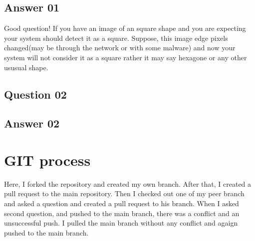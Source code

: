 \documentclass[11pt, letterpaper]{article}
\begin{document}
\subsection{Answer 01}
Good question! If you have an image of an square shape and  you are expecting your system should detect it as a square. Suppose, this image edge pixels changed(may be through the network or with some malware) and now  your system will not consider it as a square rather it may say hexagone or any other ususual shape.
\subsection{Question 02}
\subsection{Answer 02}
\section{GIT process}
Here, I forked the repository and created my own branch. After that, I created a pull request to the main repository. Then I checked out one of my peer branch and asked a question and created a pull request to his branch. When I asked second question, and pushed to the main branch, there was a conflict and an unsuccessful push. I pulled the main branch without any conflict and agaign pushed to the main branch.
\end{document}
